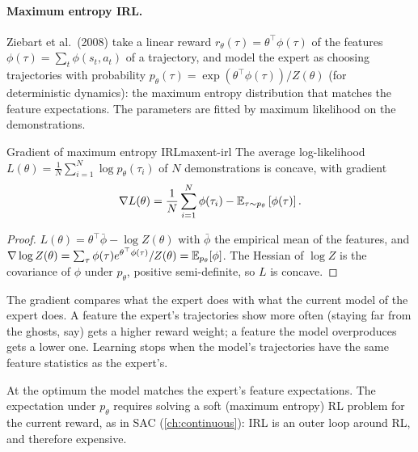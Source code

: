 \paragraph{Maximum entropy IRL.} Ziebart et al.\ (2008) take a linear
reward $r_\theta(\tau) = \theta^\top \phi(\tau)$ of the features $\phi(\tau)
= \sum_t \phi(s_t, a_t)$ of a trajectory, and model the expert as choosing
trajectories with probability $p_\theta(\tau) = \exp(\theta^\top
\phi(\tau)) / Z(\theta)$ (for deterministic dynamics): the maximum entropy
distribution that matches the feature expectations. The parameters are
fitted by maximum likelihood on the demonstrations.

\begin{proposition}{Gradient of maximum entropy IRL}{maxent-irl}
  The average log-likelihood $L(\theta) = \frac{1}{N} \sum_{i=1}^N \log
  p_\theta(\tau_i)$ of $N$ demonstrations is concave, with gradient
  \begin{equation}
    \nabla L(\theta) = \frac{1}{N} \sum_{i=1}^N \phi(\tau_i) -
    \mathbb{E}_{\tau \sim p_\theta}\left[ \phi(\tau) \right].
  \end{equation}
\end{proposition}

\begin{proof}
  $L(\theta) = \theta^\top \bar\phi - \log Z(\theta)$ with $\bar\phi$ the
  empirical mean of the features, and $\nabla \log Z(\theta) =
  \sum_\tau \phi(\tau) e^{\theta^\top \phi(\tau)} / Z(\theta) =
  \mathbb{E}_{p_\theta}[\phi]$. The Hessian of $\log Z$ is the covariance of $\phi$
  under $p_\theta$, positive semi-definite, so $L$ is concave.
\end{proof}

\begin{intuition}
  The gradient compares what the expert does with what the current model
  of the expert does. A feature the expert's trajectories show more often
  (staying far from the ghosts, say) gets a higher reward weight; a feature
  the model overproduces gets a lower one. Learning stops when the model's
  trajectories have the same feature statistics as the expert's.
\end{intuition}

At the optimum the model matches the expert's feature expectations. The
expectation under $p_\theta$ requires solving a soft (maximum entropy) RL
problem for the current reward, as in SAC (\cref{ch:continuous}): IRL is
an outer loop around RL, and therefore expensive.

